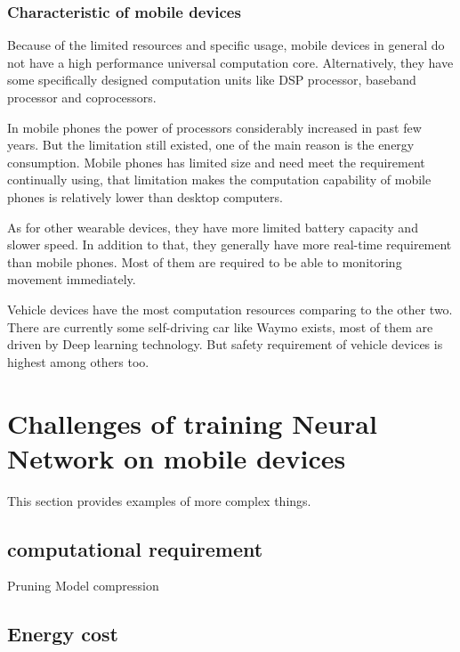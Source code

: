 \documentclass[article]{aaltoseries}
\begin{document}
\subsubsection{Characteristic of mobile devices}

Because of the limited resources and specific usage, mobile devices in general do not have a high performance 
universal computation core. Alternatively, they have some specifically designed computation units like DSP processor,
baseband processor and coprocessors.

In mobile phones the power of processors considerably increased in past few years. But the limitation still existed, 
one of the main reason is the energy consumption. Mobile phones has limited size and need meet the requirement continually
using, that limitation makes the computation capability of mobile phones is relatively lower than desktop computers.

As for other wearable devices, they have more limited battery capacity and slower speed. In addition to that, 
they generally have more real-time requirement than mobile phones. Most of them are required to be able to monitoring
movement immediately.

Vehicle devices have the most computation resources comparing to the other two. There are currently some self-driving
car like Waymo exists, most of them are driven by Deep learning technology. But safety requirement of vehicle devices
is highest among others too.  








\section{Challenges of training Neural Network on mobile devices}

This section provides examples of more complex things.




\subsection{computational requirement}
Pruning
Model compression

\subsection{Energy cost}
\end{document}
